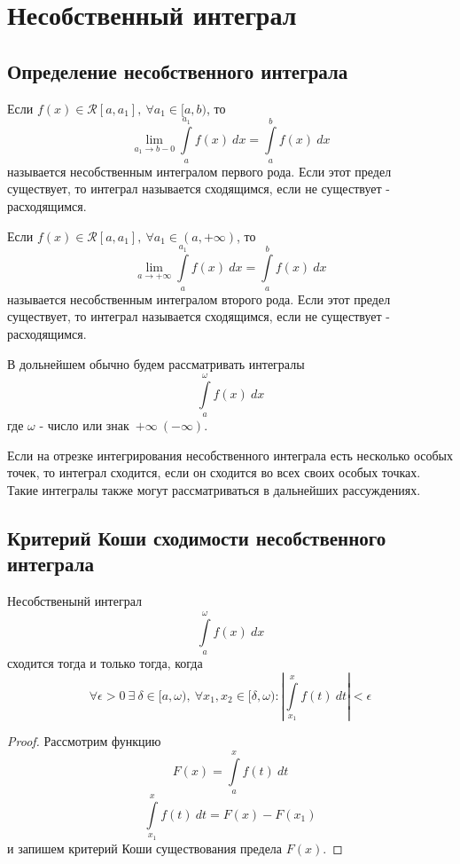 \newpage
\section{Несобственный интеграл}
\subsection{Определение несобственного интеграла}
\begin{definition}
    Если $f(x)\in \mathcal{R}[a,a_1],\ \forall a_1\in [a,b)$, то 
    \[\lim\limits_{a_1\to b-0}\int\limits_{a}^{a_1}f(x)\ dx=\int\limits_{a}^{b}f(x)\ dx\]
    называется несобственным интегралом первого рода.
    Если этот предел существует, то интеграл называется сходящимся, если не существует - расходящимся. 
\end{definition} 
\begin{definition}
    Если $f(x)\in \mathcal{R}[a,a_1],\ \forall a_1\in (a, +\infty)$, то
    \[\lim\limits_{a\to +\infty} \int\limits_{a}^{a_1}f(x)\ dx=\int\limits_{a}^{b}f(x)\ dx\]
    называется несобственным интегралом второго рода. Если этот предел существует, то интеграл называется сходящимся, если не существует - расходящимся.
\end{definition} 
\begin{comm}
    В дольнейшем обычно будем рассматривать интегралы
    \[\int\limits_{a}^{\omega}f(x)\ dx\]
    где $\omega$ - число или знак\ $+\infty\ (-\infty)$.
\end{comm} 
\begin{comm}
    Если на отрезке интегрирования несобственного интеграла есть несколько особых точек, то интеграл сходится, если он сходится во всех своих особых точках. Такие интегралы также могут рассматриваться в дальнейших рассуждениях.
\end{comm}
\subsection{Критерий Коши сходимости несобственного интеграла}
\begin{theorem}
    Несобственынй интеграл
    \[\int\limits_{a}^{\omega}f(x)\ dx\]
    сходится тогда и только тогда, когда
    \[\forall \epsilon>0\ \exists\ \delta\in [a,\omega),\ \forall x_1,x_2\in [\delta, \omega): \left|\int\limits_{x_1}^{x}f(t)\ dt\right|<\epsilon\]
\end{theorem} 
\begin{proof}
    Рассмотрим функцию
    \[F(x)=\int\limits_{a}^{x}f(t)\ dt\]
    \[\int\limits_{x_1}^{x}f(t)\ dt=F(x)-F(x_1)\]
    и запишем критерий Коши существования предела $F(x)$.
\end{proof} 

